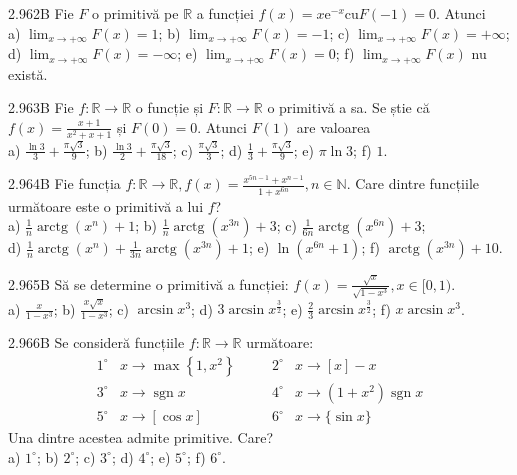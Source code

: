 \documentclass[11pt]{article}
\begin{document}
2.962B Fie $F$ o primitivă pe $\mathbb{R}$ a funcției $f(x)=x \mathrm{e}^{-x} \mathrm{cu} F(-1)=0$. Atunci\\ a) $\lim _{x \rightarrow+\infty} F(x)=1$; b) $\lim _{x \rightarrow+\infty} F(x)=-1$; c) $\lim _{x \rightarrow+\infty} F(x)=+\infty$;\\ d) $\lim _{x \rightarrow+\infty} F(x)=-\infty$; e) $\lim _{x \rightarrow+\infty} F(x)=0 $; f) $\lim _{x \rightarrow+\infty} F(x)$ nu există.

2.963B Fie $f: \mathbb{R} \rightarrow \mathbb{R}$ o funcție și $F: \mathbb{R} \rightarrow \mathbb{R}$ o primitivă a sa. Se știe că $f(x)=\frac{x+1}{x^{2}+x+1}$ și $F(0)=0$. Atunci $F(1)$ are valoarea\\ a) $\frac{\ln 3}{3}+\frac{\pi \sqrt{3}}{9}$; b) $\frac{\ln 3}{2}+\frac{\pi \sqrt{3}}{18}$; c) $\frac{\pi \sqrt{3}}{3}$; d) $\frac{1}{3}+\frac{\pi \sqrt{3}}{9}$; e) $\pi \ln 3$; f) $1$.

2.964B Fie funcția $f: \mathbb{R} \rightarrow \mathbb{R}, f(x)=\frac{x^{5 n-1}+x^{n-1}}{1+x^{6 n}}, n \in \mathbb{N}$. Care dintre funcțiile următoare este o primitivă a lui $f$?\\ a) $\frac{1}{n} \operatorname{arctg}\left(x^{n}\right)+1$; b) $\frac{1}{n} \operatorname{arctg}\left(x^{3 n}\right)+3$; c) $\frac{1}{6 n} \operatorname{arctg}\left(x^{6 n}\right)+3$;\\ d) $\frac{1}{n} \operatorname{arctg}\left(x^{n}\right)+\frac{1}{3 n} \operatorname{arctg}\left(x^{3 n}\right)+1$; e) $\ln \left(x^{6 n}+1\right)$; f) $\operatorname{arctg}\left(x^{3 n}\right)+10$.

2.965B Să se determine o primitivă a funcției: $f(x)=\frac{\sqrt{x}}{\sqrt{1-x^{3}}}, x \in[0,1)$.\\ a) $\frac{x}{1-x^{3}}$; b) $\frac{x \sqrt{x}}{1-x^{3}}$; c) $\arcsin x^{3}$; d) $3 \arcsin x^{\frac{3}{2}}$; e) $\frac{2}{3} \arcsin x^{\frac{3}{2}}$; f) $x \arcsin x^{3}$.

2.966B Se consideră funcțiile $f: \mathbb{R} \rightarrow \mathbb{R}$ următoare: $$\begin{array}{llcll}1^{\circ} & x \rightarrow \max \left\{1, x^{2}\right\} & \quad & 2^{\circ} & x \rightarrow [x] - x \\3^{\circ} & x \rightarrow \operatorname{sgn} x & \quad & 4^{\circ} & x \rightarrow \left(1 + x^{2}\right) \operatorname{sgn} x \\5^{\circ} & x \rightarrow \left[\cos x\right] & \quad & 6^{\circ} & x \rightarrow \{\sin x\}\end{array}$$ Una dintre acestea admite primitive. Care?\\ a) $1^{\circ}$; b) $2^{\circ}$; c) $3^{\circ}$; d) $4^{\circ}$; e) $5^{\circ}$; f) $6^{\circ}$.
\end{document}
